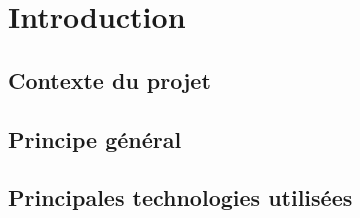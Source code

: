 \chapter{Introduction}

\section{Contexte du projet}


\section{Principe général}


\section{Principales technologies utilisées}

